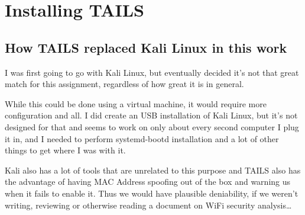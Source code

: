 \documentclass[../wifi-security.tex]{subfiles}
\begin{document}
\chapter{Installing TAILS}

\section{How TAILS replaced Kali Linux in this work}

I was first going to go with Kali Linux, but eventually decided it's not that great match for this assignment, regardless of how great it is in general.

While this could be done using a virtual machine, it would require more configuration and all. I did create an USB installation of Kali Linux, but it's not designed for that and seems to work on only about every second computer I plug it in, and I needed to perform systemd-bootd installation and a lot of other things to get where I was with it.

Kali also has a lot of tools that are unrelated to this purpose and TAILS also has the advantage of having MAC Address spoofing out of the box and warning us when it fails to enable it. Thus we would have plausible deniability, if we weren't writing, reviewing or otherwise reading a document on WiFi security analysis…
\end{document}
